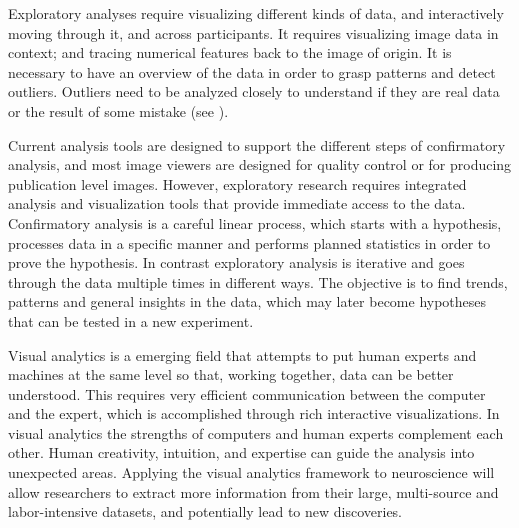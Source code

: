 \documentclass[utf8]{frontiersSCNS} %
\begin{document}
Exploratory analyses require visualizing different kinds of data, and interactively moving through it, and across participants. It requires visualizing image data in context; and tracing numerical features back to the image of origin. It is necessary to have an overview of the data in order to grasp patterns and detect outliers. Outliers need to be analyzed closely to understand if they are real data or the result of some mistake (see \cite{schneiderman_designing_1998}). 

Current analysis tools  are designed to support the different steps of confirmatory analysis, and most image viewers are designed for quality control or for producing publication level images. However, exploratory research requires integrated analysis and visualization tools that provide immediate access to the data. Confirmatory analysis is a careful linear process, which starts with a hypothesis, processes data in a specific manner and performs planned statistics in order to prove the hypothesis. In contrast exploratory analysis is iterative and goes through the data multiple times in different ways. The objective is to find trends, patterns and general insights in the data, which may later become hypotheses that can be tested in a new experiment.

Visual analytics\citep{cook_illuminating_2005} is a emerging field that attempts to put human experts and machines at the same level so that, working together, data can be better understood. This requires very efficient communication between the computer and the expert, which is accomplished through rich interactive visualizations. In visual analytics the strengths of computers and human experts complement each other. Human creativity, intuition, and expertise can guide the analysis into unexpected areas. Applying the visual analytics framework to neuroscience will allow researchers to extract more information from their large, multi-source and labor-intensive datasets, and potentially lead to new discoveries.
\end{document}

